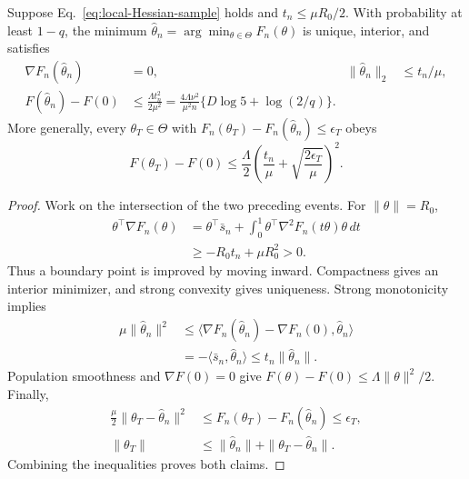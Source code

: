\begin{theorem}
\label{thm:local-fast-rate}
Suppose Eq.~\eqref{eq:local-Hessian-sample} holds and
$t_n\leq\mu R_0/2$. With probability at least $1-q$, the minimum
$\widehat\theta_n=\arg\min_{\theta\in\Theta}F_n(\theta)$ is unique,
interior, and satisfies
\begin{align}
\nabla F_n(\widehat\theta_n)&=0,&
\|\widehat\theta_n\|_2&\leq t_n/\mu,\\
F(\widehat\theta_n)-F(0)
&\leq\frac{\Lambda t_n^2}{2\mu^2}
=\frac{4\Lambda\nu^2}{\mu^2 n}
\{D\log5+\log(2/q)\}.
\label{eq:local-fast-rate}
\end{align}
More generally, every $\theta_T\in\Theta$ with
$F_n(\theta_T)-F_n(\widehat\theta_n)\leq\epsilon_T$ obeys
\begin{equation}
F(\theta_T)-F(0)
\leq\frac{\Lambda}{2}
\left(\frac{t_n}{\mu}+\sqrt{\frac{2\epsilon_T}{\mu}}\right)^2 .
\label{eq:local-optimization-statistics}
\end{equation}
\end{theorem}
\begin{proof}
Work on the intersection of the two preceding events.
For $\|\theta\|=R_0$,
\begin{align}
\theta^\top\nabla F_n(\theta)
&=\theta^\top\bar s_n+
\int_0^1\theta^\top\nabla^2F_n(t\theta)\theta\,dt\\
&\geq-R_0t_n+\mu R_0^2>0 .
\end{align}
Thus a boundary point is improved by moving inward.
Compactness gives an interior minimizer, and strong convexity gives
uniqueness. Strong monotonicity implies
\begin{align}
\mu\|\widehat\theta_n\|^2
&\leq\langle\nabla F_n(\widehat\theta_n)-\nabla F_n(0),
\widehat\theta_n\rangle\\
&=-\langle\bar s_n,\widehat\theta_n\rangle
\leq t_n\|\widehat\theta_n\| .
\end{align}
Population smoothness and $\nabla F(0)=0$ give
$F(\theta)-F(0)\leq\Lambda\|\theta\|^2/2$.
Finally,
\begin{align}
\tfrac\mu2\|\theta_T-\widehat\theta_n\|^2
&\leq F_n(\theta_T)-F_n(\widehat\theta_n)\leq\epsilon_T,\\
\|\theta_T\|&\leq
\|\widehat\theta_n\|+\|\theta_T-\widehat\theta_n\| .
\end{align}
Combining the inequalities proves both claims.
\end{proof}

